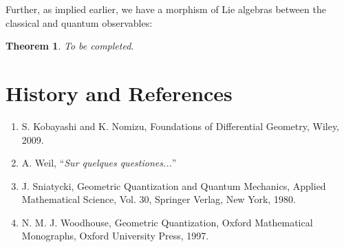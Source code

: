 \documentclass{tufte-handout}
\newtheorem{thrm}{Theorem}
\begin{document}
Further, as implied earlier, we have a morphism of Lie algebras between the classical and quantum observables:
\begin{thrm}
\emph{To be completed.}%
\end{thrm}
\section{History and References}
\begin{enumerate}
\item S. Kobayashi and K. Nomizu, Foundations of Differential Geometry, Wiley, 2009.

\item A. Weil, ``\emph{Sur quelques questiones...}'' %

\item J. Sniatycki, Geometric Quantization and Quantum Mechanics, Applied Mathematical Science, Vol. 30, Springer Verlag, New York, 1980.

\item N. M. J. Woodhouse, Geometric Quantization, Oxford Mathematical Monographs, Oxford University Press, 1997.
\end{enumerate}
\end{document}
